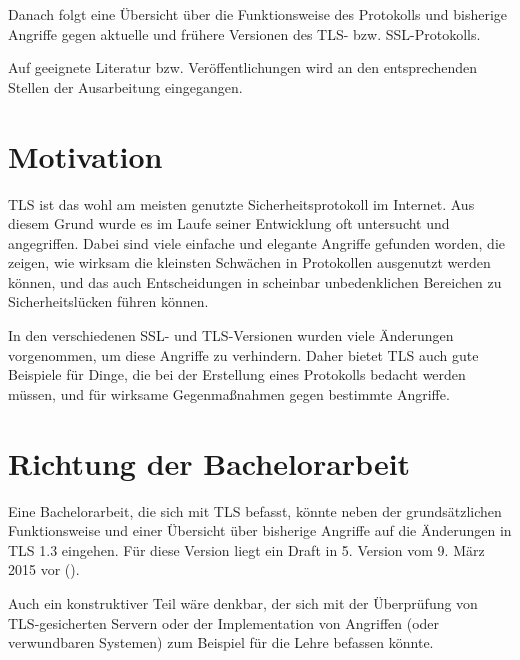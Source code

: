 Danach folgt eine Übersicht über die Funktionsweise des Protokolls und bisherige Angriffe gegen aktuelle und frühere Versionen des TLS- bzw. SSL-Protokolls.

Auf geeignete Literatur bzw. Veröffentlichungen wird an den entsprechenden Stellen der Ausarbeitung eingegangen.

\section{Motivation}

TLS ist das wohl am meisten genutzte Sicherheitsprotokoll im Internet. Aus diesem Grund wurde es im Laufe seiner Entwicklung oft untersucht und angegriffen. Dabei sind viele einfache und elegante Angriffe gefunden worden, die zeigen, wie wirksam die kleinsten Schwächen in Protokollen ausgenutzt werden können, und das auch Entscheidungen in scheinbar unbedenklichen Bereichen zu Sicherheitslücken führen können. 

In den verschiedenen SSL- und TLS-Versionen wurden viele Änderungen vorgenommen, um diese Angriffe zu verhindern. Daher bietet TLS auch gute Beispiele für Dinge, die bei der Erstellung eines Protokolls bedacht werden müssen, und für wirksame Gegenmaßnahmen gegen bestimmte Angriffe.

\section{Richtung der Bachelorarbeit}

Eine Bachelorarbeit, die sich mit TLS befasst, könnte neben der grundsätzlichen Funktionsweise und einer Übersicht über bisherige Angriffe auf die Änderungen in TLS 1.3 eingehen. Für diese Version liegt ein Draft in 5. Version vom 9. März 2015 vor (\cite{tls13}). 

Auch ein konstruktiver Teil wäre denkbar, der sich mit der Überprüfung von TLS-gesicherten Servern oder der Implementation von Angriffen (oder verwundbaren Systemen) zum Beispiel für die Lehre befassen könnte. 